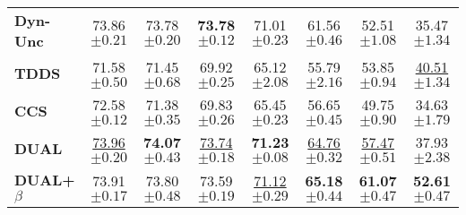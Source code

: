 \begin{table}[ht]
\begin{tabular}{lccccccc}
    \textbf{Dyn-Unc} & 73.86 \scriptsize{$\pm 0.21 $} & 73.78 \scriptsize{$ \pm 0.20 $} & \textbf{73.78} \scriptsize{$ \pm 0.12 $} & 71.01 \scriptsize{$ \pm 0.23 $} & 61.56 \scriptsize{$ \pm 0.46 $} & 52.51 \scriptsize{$ \pm 1.08 $} & 35.47 \scriptsize{$ \pm 1.34 $} \\
    
    \textbf{TDDS} & 71.58 \scriptsize{$ \pm 0.50 $} & 71.45 \scriptsize{$ \pm 0.68 $} & 69.92 \scriptsize{$ \pm 0.25 $} & 65.12 \scriptsize{$ \pm 2.08 $} & 55.79 \scriptsize{$ \pm 2.16 $} & 53.85 \scriptsize{$ \pm 0.94 $} & \underline{40.51} \scriptsize{$ \pm 1.34 $} \\
    
    \textbf{CCS} & 72.58 \scriptsize{$ \pm 0.12 $} & 71.38 \scriptsize{$ \pm 0.35 $} & 69.83 \scriptsize{$ \pm 0.26 $} & 65.45 \scriptsize{$ \pm 0.23 $} & 56.65 \scriptsize{$ \pm 0.45 $} & 49.75 \scriptsize{$ \pm 0.90 $} & 34.63 \scriptsize{$ \pm 1.79 $} \\
    
    \midrule
    
    \textbf{DUAL} & \underline{73.96} \scriptsize{$ \pm 0.20 $} & \textbf{74.07} \scriptsize{$ \pm 0.43 $} & \underline{73.74} \scriptsize{$ \pm 0.18 $} & \textbf{71.23} \scriptsize{$ \pm 0.08$} & \underline{64.76} \scriptsize{$ \pm 0.32 $} & \underline{57.47} \scriptsize{$ \pm 0.51 $} & 37.93 \scriptsize{$ \pm 2.38 $} \\
    
    \textbf{DUAL+$\beta$} & 73.91 \scriptsize{$ \pm 0.17 $} & 73.80 \scriptsize{$ \pm 0.48 $} & 73.59 \scriptsize{$ \pm 0.19 $} & \underline{71.12} \scriptsize{$ \pm 0.29 $} & \textbf{65.18} \scriptsize{$ \pm 0.44 $} & \textbf{61.07} \scriptsize{$ \pm 0.47 $} & \textbf{52.61} \scriptsize{$ \pm 0.47 $} \\
    
    \bottomrule
\end{tabular}
\end{table}





